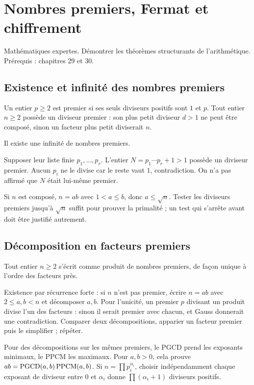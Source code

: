 \documentclass[../cours_tle.tex]{subfiles}
\begin{document}
\setcounter{chapter}{30}
\chapter{Nombres premiers, Fermat et chiffrement}
\label{ch:31}
\begin{objectif}
Mathématiques expertes. Démontrer les théorèmes structurants de l'arithmétique. Prérequis : chapitres 29 et 30.
\end{objectif}
\section{Existence et infinité des nombres premiers}
Un entier $p\ge2$ est premier si ses seuls diviseurs positifs sont $1$ et $p$.
Tout entier $n\ge2$ possède un diviseur premier : son plus petit diviseur $d>1$ ne peut être composé, sinon un facteur plus petit diviserait $n$.
\begin{theoreme}
Il existe une infinité de nombres premiers.
\end{theoreme}
\begin{demonstration}
Supposer leur liste finie $p_1,\ldots,p_r$. L'entier $N=p_1\cdots p_r+1>1$ possède un diviseur premier. Aucun $p_i$ ne le divise car le reste vaut $1$, contradiction.
On n'a pas affirmé que $N$ était lui-même premier.
\end{demonstration}
Si $n$ est composé, $n=ab$ avec $1<a\le b$, donc $a\le\sqrt n$. Tester les diviseurs premiers jusqu'à $\sqrt n$ suffit pour prouver la primalité ; un test qui s'arrête avant doit être justifié autrement.
\section{Décomposition en facteurs premiers}
\begin{theoreme}
Tout entier $n\ge2$ s'écrit comme produit de nombres premiers, de façon unique à l'ordre des facteurs près.
\end{theoreme}
\begin{demonstration}
Existence par récurrence forte : si $n$ n'est pas premier, écrire $n=ab$ avec $2\le a,b<n$ et décomposer $a,b$.
Pour l'unicité, un premier $p$ divisant un produit divise l'un des facteurs : sinon il serait premier avec chacun, et Gauss donnerait une contradiction. Comparer deux décompositions, apparier un facteur premier puis le simplifier ; répéter.
\end{demonstration}
Pour des décompositions sur les mêmes premiers, le PGCD prend les exposants minimaux, le PPCM les maximaux. Pour $a,b>0$, cela prouve $ab=\operatorname{PGCD}(a,b)\operatorname{PPCM}(a,b)$.
Si $n=\prod p_i^{\alpha_i}$, choisir indépendamment chaque exposant de diviseur entre $0$ et $\alpha_i$ donne $\prod(\alpha_i+1)$ diviseurs positifs.
\end{document}
